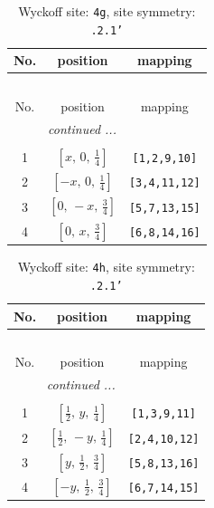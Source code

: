 \documentclass[fleqn,8pt]{jsarticle}
\begin{document}
\begin{longtable}{ccc}
\caption{Wyckoff site: {\tt 4g}, site symmetry: {\tt .2.1'}}
 \\
 \hline \hline
No. & position & mapping \\ \hline \endfirsthead

\multicolumn{2}{l}{\tablename\ \thetable{}} \\
 \hline \hline
No. & position & mapping \\ \hline \endhead

 \hline \hline
\multicolumn{2}{r}{\footnotesize\it continued ...} \\ \endfoot

 \hline \hline
\multicolumn{2}{r}{} \\ \endlastfoot

1 & $\left[ x,\, 0,\, \frac{1}{4} \right]$ & {\tt [1,2,9,10]} \\ \hline
2 & $\left[ - x,\, 0,\, \frac{1}{4} \right]$ & {\tt [3,4,11,12]} \\ \hline
3 & $\left[ 0,\, - x,\, \frac{3}{4} \right]$ & {\tt [5,7,13,15]} \\ \hline
4 & $\left[ 0,\, x,\, \frac{3}{4} \right]$ & {\tt [6,8,14,16]} \\
\end{longtable}
\renewcommand{\arraystretch}{1.2}
\begin{longtable}{ccc}
\caption{Wyckoff site: {\tt 4h}, site symmetry: {\tt .2.1'}}
 \\
 \hline \hline
No. & position & mapping \\ \hline \endfirsthead

\multicolumn{2}{l}{\tablename\ \thetable{}} \\
 \hline \hline
No. & position & mapping \\ \hline \endhead

 \hline \hline
\multicolumn{2}{r}{\footnotesize\it continued ...} \\ \endfoot

 \hline \hline
\multicolumn{2}{r}{} \\ \endlastfoot

1 & $\left[ \frac{1}{2},\, y,\, \frac{1}{4} \right]$ & {\tt [1,3,9,11]} \\ \hline
2 & $\left[ \frac{1}{2},\, - y,\, \frac{1}{4} \right]$ & {\tt [2,4,10,12]} \\ \hline
3 & $\left[ y,\, \frac{1}{2},\, \frac{3}{4} \right]$ & {\tt [5,8,13,16]} \\ \hline
4 & $\left[ - y,\, \frac{1}{2},\, \frac{3}{4} \right]$ & {\tt [6,7,14,15]} \\
\end{longtable}
\end{document}
